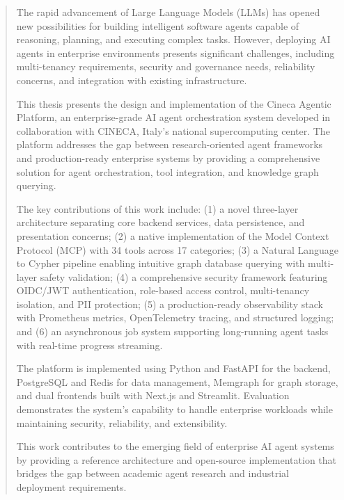 \documentclass[a4paper,twoside]{sapthesis}
\begin{document}
\begin{abstract}
    
    The rapid advancement of Large Language Models (LLMs) has opened new possibilities for building intelligent software agents capable of reasoning, planning, and executing complex tasks. However, deploying AI agents in enterprise environments presents significant challenges, including multi-tenancy requirements, security and governance needs, reliability concerns, and integration with existing infrastructure.
    
    This thesis presents the design and implementation of the Cineca Agentic Platform, an enterprise-grade AI agent orchestration system developed in collaboration with CINECA, Italy's national supercomputing center. The platform addresses the gap between research-oriented agent frameworks and production-ready enterprise systems by providing a comprehensive solution for agent orchestration, tool integration, and knowledge graph querying.
    
    The key contributions of this work include: (1) a novel three-layer architecture separating core backend services, data persistence, and presentation concerns; (2) a native implementation of the Model Context Protocol (MCP) with 34 tools across 17 categories; (3) a Natural Language to Cypher pipeline enabling intuitive graph database querying with multi-layer safety validation; (4) a comprehensive security framework featuring OIDC/JWT authentication, role-based access control, multi-tenancy isolation, and PII protection; (5) a production-ready observability stack with Prometheus metrics, OpenTelemetry tracing, and structured logging; and (6) an asynchronous job system supporting long-running agent tasks with real-time progress streaming.
    
    The platform is implemented using Python and FastAPI for the backend, PostgreSQL and Redis for data management, Memgraph for graph storage, and dual frontends built with Next.js and Streamlit. Evaluation demonstrates the system's capability to handle enterprise workloads while maintaining security, reliability, and extensibility.
    
    This work contributes to the emerging field of enterprise AI agent systems by providing a reference architecture and open-source implementation that bridges the gap between academic agent research and industrial deployment requirements.
\end{abstract}
\end{document}
